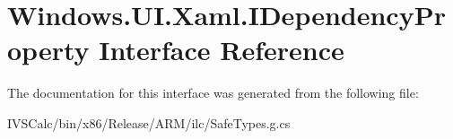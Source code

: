 \hypertarget{interface_windows_1_1_u_i_1_1_xaml_1_1_i_dependency_property}{}\section{Windows.\+U\+I.\+Xaml.\+I\+Dependency\+Property Interface Reference}
\label{interface_windows_1_1_u_i_1_1_xaml_1_1_i_dependency_property}


The documentation for this interface was generated from the following file\+:\begin{DoxyCompactItemize}
\item 
I\+V\+S\+Calc/bin/x86/\+Release/\+A\+R\+M/ilc/Safe\+Types.\+g.\+cs\end{DoxyCompactItemize}
